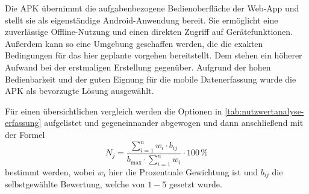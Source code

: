 Die APK übernimmt die aufgabenbezogene Bedienoberfläche der Web-App und stellt sie als eigenständige Android-Anwendung bereit.
Sie ermöglicht eine zuverlässige Offline-Nutzung und einen direkten Zugriff auf Gerätefunktionen.
Außerdem kann so eine Umgebung geschaffen werden, die die exakten Bedingungen für das hier geplante vorgehen bereitstellt.
Dem stehen ein höherer Aufwand bei der erstmaligen Erstellung gegenüber.
Aufgrund der hohen Bedienbarkeit und der guten Eignung für die mobile Datenerfassung wurde die APK als bevorzugte Lösung ausgewählt.

Für einen übersichtlichen vergleich werden die Optionen in \cref{tab:nutzwertanalyse-erfassung} aufgelistet und gegeneinnander abgewogen und dann anschließend mit der Formel
\begin{equation}
    N_j =
    \frac{\sum_{i=1}^{n} w_i \cdot b_{ij}}
    {b_{\max} \cdot \sum_{i=1}^{n} w_i}
    \cdot 100\,\%\label{eq:equation}
\end{equation}
bestimmt werden, wobei $w_i$ hier die Prozentuale Gewichtung ist und $b_{ij}$ die selbstgewählte Bewertung, welche von $1 - 5$ gesetzt wurde.


